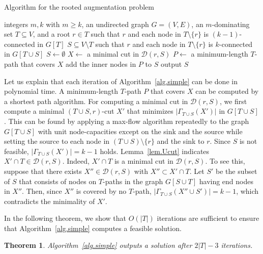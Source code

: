 \documentclass[11pt]{article}
\newcommand{\Dfam}{\mathcal{D}}
\newtheorem{theorem}{Theorem}
\begin{document}
 \begin{algorithm}
  \caption{Algorithm for the rooted augmentation problem}
  \label{alg.simple}
  \begin{algorithmic}
   \REQUIRE
   integers  $m,k$ with $m \geq k$,
   an undirected graph $G=(V,E)$,
   an $m$-dominating set $T \subseteq V$,
   and a root $r \in T$ such that
   $r$ and each node in $T \setminus \{r\}$ is
   $(k-1)$-connected in $G[T]$
   \ENSURE $S \subseteq V \setminus T$ such that
   $r$ and each node in $T \setminus \{r\}$ is $k$-connected in $G[T\cup S]$
   \STATE $S \longleftarrow \emptyset$
   \STATE $X \longleftarrow$ a minimal cut in $\Dfam(r,S)$
   \STATE $P \longleftarrow$ a minimum-length $T$-path that covers $X$
   \STATE add the inner nodes in $P$ to $S$
   \ENDWHILE
   \STATE output $S$
  \end{algorithmic}
 \end{algorithm}

 Let us explain that each iteration of Algorithm~\ref{alg.simple} can be done in polynomial time.
 A minimum-length $T$-path $P$ that covers $X$
 can be computed by a shortest path algorithm.
 For computing a minimal cut in $\Dfam(r,S)$,
 we first compute a minimal $(T\cup S, r)$-cut $X'$ that minimizes
 $|\Gamma_{T\cup S}(X')|$ in $G[T \cup S]$. This can be found by applying 
 a max-flow algorithm repeatedly to the graph $G[T\cup S]$ with unit
 node-capacities except on the sink and the source
 while setting the source to each node in $(T
 \cup S) \setminus \{r\}$ and the sink to $r$.
 Since $S$ is not feasible, $|\Gamma_{T \cup S}(X')|=k-1$ holds.
 Lemma~\ref{lem.Ucut} indicates $X' \cap T \in \Dfam(r,S)$.
 Indeed, $X' \cap T$ is a minimal cut in $\Dfam(r,S)$. To see this, 
 suppose that there exists $X'' \in \Dfam(r,S)$ with $X'' \subset X'
 \cap T$.
 Let $S'$ be the subset of $S$ that consists of nodes on
 $T$-paths  in the graph $G[S\cup T]$ having end nodes in $X''$. Then, since $X''$ is 
 covered by no $T$-path, $|\Gamma_{T\cup S}(X'' \cup S')|=k-1$, which
 contradicts the minimality of $X'$.
 
 
 
In the following theorem, we show that $O(|T|)$ iterations are sufficient to ensure that
Algorithm~\ref{alg.simple} computes a feasible solution.

 \begin{theorem}
  \label{thm.simple-alg}
 Algorithm~\ref{alg.simple} 
  outputs a solution after $2|T|-3$ iterations.
 \end{theorem}
\end{document}
